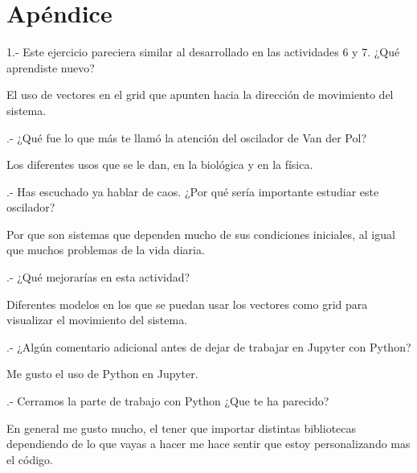 \documentclass{article}
\begin{document}
\section{Apéndice}


    1.- Este ejercicio pareciera similar al desarrollado en las actividades 6 y 7. ¿Qué aprendiste nuevo?
    
    \vspace{0.3cm}
	El uso de vectores en el grid que apunten hacia la dirección de movimiento del sistema.
    \vspace{0.3cm}
    
.- ¿Qué fue lo que más te llamó la atención del oscilador de Van der Pol? 
    
    \vspace{0.3cm}
	Los diferentes usos que se le dan, en la biológica y en la física. 
    \vspace{0.3cm}
    
.- Has escuchado ya hablar de caos. ¿Por qué sería importante estudiar este oscilador?
    
    \vspace{0.3cm}
	Por que son sistemas que dependen mucho de sus condiciones iniciales, al igual que muchos problemas de la vida diaria.
    \vspace{0.3cm}
    
.- ¿Qué mejorarías en esta actividad?
    
    \vspace{0.3cm}
	Diferentes modelos en los que se puedan usar los vectores como grid para visualizar el movimiento del sistema.
    \vspace{0.3cm}
    
.- ¿Algún comentario adicional antes de dejar de trabajar en Jupyter con Python?
    
    \vspace{0.3cm}
	Me gusto el uso de Python en Jupyter.
    \vspace{0.3cm}
    
.- Cerramos la parte de trabajo con Python ¿Que te ha parecido?
    
    \vspace{0.3cm}
	En general me gusto mucho, el tener que importar distintas bibliotecas dependiendo de lo que vayas a hacer me hace sentir que estoy personalizando mas el código.
    \vspace{0.3cm}
\end{document}
